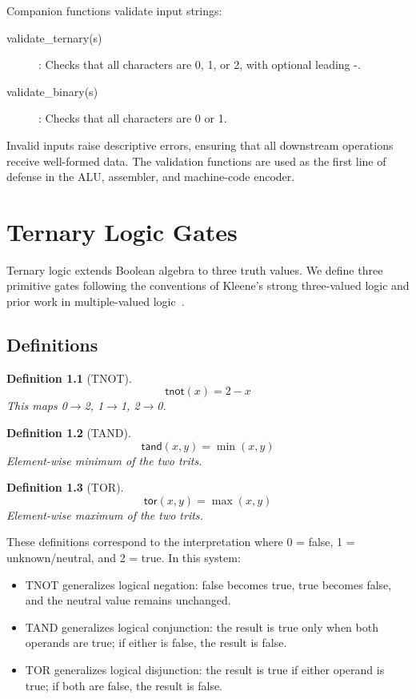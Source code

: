 \documentclass[12pt,a4paper,twoside]{book}
\theoremstyle{trinarytheorem}
\theoremstyle{trinarydefinition}
\newtheorem{definition}{Definition}[chapter]
\newcommand{\code}[1]{\textsf{#1}}
\begin{document}
Companion functions validate input strings:
\begin{description}
    \item[\code{validate\_ternary(s)}]: Checks that all characters are \code{0},
          \code{1}, or \code{2}, with optional leading \code{-}.
    \item[\code{validate\_binary(s)}]: Checks that all characters are \code{0}
          or \code{1}.
\end{description}

Invalid inputs raise descriptive errors, ensuring that all downstream operations
receive well-formed data. The validation functions are used as the first line of
defense in the ALU, assembler, and machine-code encoder.

\chapter{Ternary Logic Gates}
\label{ch:gates}

Ternary logic extends Boolean algebra to three truth values. We define three primitive
gates following the conventions of Kleene's strong three-valued logic and prior work in
multiple-valued logic~\cite{smith1997mvl,epstein1985mvl}.

\section{Definitions}

\begin{definition}[TNOT]
\[
\code{tnot}(x) = 2 - x
\]
This maps 0$\rightarrow$2, 1$\rightarrow$1, 2$\rightarrow$0.
\end{definition}

\begin{definition}[TAND]
\[
\code{tand}(x, y) = \min(x, y)
\]
Element-wise minimum of the two trits.
\end{definition}

\begin{definition}[TOR]
\[
\code{tor}(x, y) = \max(x, y)
\]
Element-wise maximum of the two trits.
\end{definition}

These definitions correspond to the interpretation where 0 = false, 1 = unknown/neutral,
and 2 = true. In this system:
\begin{itemize}
    \item TNOT generalizes logical negation: false becomes true, true becomes false, and
          the neutral value remains unchanged.
    \item TAND generalizes logical conjunction: the result is true only when both
          operands are true; if either is false, the result is false.
    \item TOR generalizes logical disjunction: the result is true if either operand
          is true; if both are false, the result is false.
\end{itemize}
\end{document}
